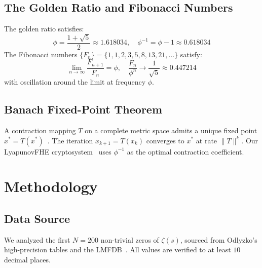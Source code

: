 \documentclass[11pt,a4paper]{article}
\begin{document}
\subsection{The Golden Ratio and Fibonacci Numbers}

The golden ratio satisfies:
\begin{equation}
\phi = \frac{1+\sqrt{5}}{2} \approx 1.618034, \quad \phi^{-1} = \phi - 1 \approx 0.618034
\end{equation}
The Fibonacci numbers $\{F_n\} = \{1, 1, 2, 3, 5, 8, 13, 21, \ldots\}$ satisfy:
\begin{equation}
\lim_{n \to \infty} \frac{F_{n+1}}{F_n} = \phi, \quad \frac{F_n}{\phi^n} \to \frac{1}{\sqrt{5}} \approx 0.447214
\end{equation}
with oscillation around the limit at frequency $\phi$.

\subsection{Banach Fixed-Point Theorem}

A contraction mapping $T$ on a complete metric space admits a unique fixed point $x^* = T(x^*)$~\cite{banach1922}. The iteration $x_{k+1} = T(x_k)$ converges to $x^*$ at rate $\|T\|^k$. Our LyapunovFHE cryptosystem~\cite{fernandez2026fhe} uses $\phi^{-1}$ as the optimal contraction coefficient.

\newpage

\section{Methodology}
\label{sec:methodology}

\subsection{Data Source}

We analyzed the first $N = 200$ non-trivial zeros of $\zeta(s)$, sourced from Odlyzko's high-precision tables and the LMFDB~\cite{lmfdb2024}. All values are verified to at least $10$ decimal places.
\end{document}
